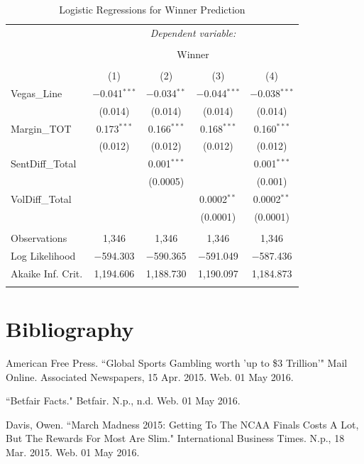 \documentclass[12pt]{article}
\begin{document}
\begin{doublespacing}
\begin{table}[H] 
\centering 
\caption{Logistic Regressions for Winner Prediction} 
\label{table:winnerprediction} 
\begin{tabular*}{\textwidth}{@{\extracolsep{\fill}}lcccc} 
\hline 
\hline
 & \multicolumn{4}{c}{\textit{Dependent variable:}} \\ 
\cline{2-5} 
\\[-3.0ex] & \multicolumn{4}{c}{Winner} \\ 
\\[-1.5ex] & (1) & (2) & (3) & (4)\\ 
\hline
 Vegas\_Line & $-$0.041$^{***}$ & $-$0.034$^{**}$ & $-$0.044$^{***}$ & $-$0.038$^{***}$ \\ 
  & (0.014) & (0.014) & (0.014) & (0.014) \\ 
 Margin\_TOT & 0.173$^{***}$ & 0.166$^{***}$ & 0.168$^{***}$ & 0.160$^{***}$ \\ 
  & (0.012) & (0.012) & (0.012) & (0.012) \\ 
 SentDiff\_Total &  & 0.001$^{***}$ &  & 0.001$^{***}$ \\ 
  &  & (0.0005) &  & (0.001) \\ 
 VolDiff\_Total &  &  & 0.0002$^{**}$ & 0.0002$^{**}$ \\ 
  &  &  & (0.0001) & (0.0001) \\ 
\hline \\[-1.8ex] 
Observations & 1,346 & 1,346 & 1,346 & 1,346 \\ 
Log Likelihood & $-$594.303 & $-$590.365 & $-$591.049 & $-$587.436 \\ 
Akaike Inf. Crit. & 1,194.606 & 1,188.730 & 1,190.097 & 1,184.873 \\
\hline 
\hline \\[-1.8ex] 
\end{tabular*} 
\end{table}  

\newpage

\section{Bibliography}

American Free Press. ``Global Sports Gambling worth 'up to \$3 Trillion'" Mail Online. 	Associated Newspapers, 15 Apr. 2015. Web. 01 May 2016.

``Betfair Facts." Betfair. N.p., n.d. Web. 01 May 2016.

Davis, Owen. ``March Madness 2015: Getting To The NCAA Finals Costs A Lot, But The 	Rewards For Most Are Slim." International Business Times. N.p., 18 Mar. 2015. 	Web. 01 May 2016.


\end{doublespacing}
\end{document}
